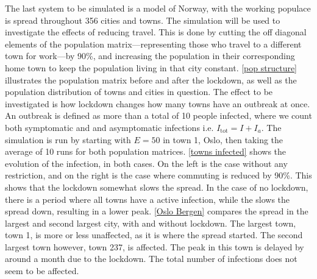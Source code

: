 \documentclass{article}
\begin{document}
    The last system to be simulated is a model of Norway, with the working populace is spread throughout 356 cities and towns. 
    The simulation will be used to investigate the effects of reducing travel.
    This is done by cutting the off diagonal elements of the population matrix---representing those who travel to a different town for work---by 90\%, and increasing the population in their corresponding home town to keep the population living in that city constant.
    \autoref{pop structure} illustrates the population matrix before and after the lockdown, as well as the population distribution of towns and cities in question.
    The effect to be investigated is how lockdown changes how many towns have an outbreak at once.
    An outbreak is defined as more than a total of 10 people infected, where we count both symptomatic and and asymptomatic infections i.e. $I_\mathrm{tot}=I + I_a$.
    The simulation is run by starting with $E=50$ in town 1, Oslo, then taking the average of 10 runs for both population matrices.
    \autoref{towns infected} shows the evolution of the infection, in both cases. 
    On the left is the case without any restriction, and on the right is the case where commuting is reduced by 90\%. 
    This shows that the lockdown somewhat slows the spread.
    In the case of no lockdown, there is a period where all towns have a active infection, while the slows the spread down, resulting in a lower peak.
    \autoref{Oslo Bergen} compares the spread in the largest and second largest city, with and without lockdown.
    The largest town, town 1, is more or less unaffected, as it is where the spread started.
    The second largest town however, town 237, is affected.
    The peak in this town is delayed by around a month due to the lockdown.
    The total number of infections does not seem to be affected.
\end{document}
